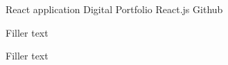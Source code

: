 

\begin{cventries}

    \cventry
    {React application} %
    {Digital Portfolio} %
    {React.js} %
    {Github} %
    {
        \begin{cvitems}
            \item Filler text
            \item Filler text
        \end{cvitems}
    }
\end{cventries}
